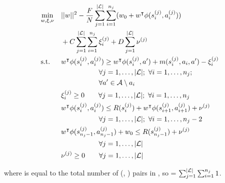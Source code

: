 \begin{align}
& \underset{w, \xi, \nu}{\min}  & & ||\weights{}||^2 - \frac{\bellmanc{}}{\labelsatotal{}} \sum_{j=1}^{\labelsetsize{}} 
  \sum_{i=1}^{\nsub{j}} (\weightszero{} + \weightst{}\features{\statesubsup{i}{(j)}}{\actionsubsup{i}{(j)}})\\
&    & & + \marginslackc{} \sum_{j=1}^{\labelsetsize{}} \sum_{i=1}^{\nsub{j}} 
            \marginslacksubsup{i}{(j)}+ \bellmanslackc{} \sum_{j=1}^{\labelsetsize{}} 
            \bellmanslacksup{(j)} \\
& \text{s.t.} & &\weightst{} \features{\statesubsup{i}{(j)}}{\actionsubsup{i}{(j)}} \geq \weightst{} \phi(\statesubsup{i}{(j)}, \actionvar{}') + \marginvar{}(\statesubsup{i}{(j)}, \actionsub{i}, \actionvar{}') - \marginslacksubsup{i}{(j)} \notag\\
    &&&\hspace{1.9cm}\forall j = 1, \ldots, \labelsetsize{}; \text{ } \forall i = 1, \ldots, \nsub{j}; \notag\\
    &&&\hspace{1.9cm}\forall \actionvar{}' \in \actionset{}\setminus \actionvar{}_i  \notag\\
&    & & \marginslacksubsup{i}{(j)} \geq 0 \hspace{0.7cm} \forall j = 1, \ldots, \labelsetsize{}; \text{ } \forall i = 1, \ldots, \nsub{j} \notag\\
&    & & \weightst{}\features{\statesubsup{i}{(j)}}{\actionsubsup{i}{(j)}} \leq \rewardfn{}(\statesubsup{i}{(j)}) + \weightst{}\features{\statesubsup{i+1}{(j)}}{\actionsubsup{i+1}{(j)}} + \bellmanslacksup{(j)} \notag \\
    &&&\hspace{1.9cm} \forall j = 1, \ldots, \labelsetsize{}; \text{ } \forall i = 1, \ldots, \nsub{j} - 2 \label{eq:bellman_constr}\\
&    & & \weightst{}\features{\statesubsup{\nsub{j}-1}{(j)}}{\actionsubsup{\nsub{j}-1}{(j)}} + \weightszero \leq \rewardfn{}(\statesubsup{\nsub{j}-1}{(j)}) + \bellmanslacksup{(j)} \notag \\
    &&&\hspace{1.9cm} \forall j = 1, \ldots, \labelsetsize{} \label{eq:bellman_goal_constr}\\
&    & & \bellmanslacksup{(j)} \geq 0 \hspace{0.7cm} \forall j = 1, \ldots, \labelsetsize{} \label{eq:bellman_slack}
\end{align}

where  is equal to the total number of
(\statevar{}, \actionvar{}) pairs in , so  = 
$\sum_{j=1}^{|\mathcal{L}|{}} \sum_{i=1}^{n_{j}} 1$.


